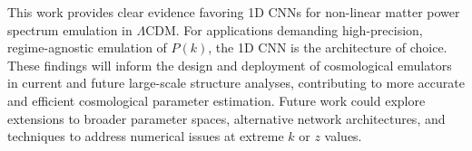 \documentclass[twocolumn]{aastex631}
\begin{document}
This work provides clear evidence favoring 1D CNNs for non-linear matter power spectrum emulation in \(\Lambda\)CDM. For applications demanding high-precision, regime-agnostic emulation of $P(k)$, the 1D CNN is the architecture of choice. These findings will inform the design and deployment of cosmological emulators in current and future large-scale structure analyses, contributing to more accurate and efficient cosmological parameter estimation. Future work could explore extensions to broader parameter spaces, alternative network architectures, and techniques to address numerical issues at extreme $k$ or $z$ values.

{}

\end{document}
